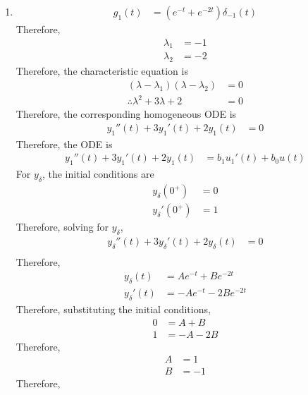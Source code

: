 \documentclass[fleqn, a4paper, 11pt, oneside]{amsart}
\theoremstyle{definition}
\theoremstyle{theorem}
\begin{document}
\begin{solution}
	\begin{enumerate}[leftmargin=*]
		\item
			\begin{align*}
				g_1(t) & = \left( e^{-t} + e^{-2 t} \right) \delta_{-1}(t)
			\end{align*}
			Therefore,
			\begin{align*}
				\lambda_1 & = -1 \\
				\lambda_2 & = -2
			\end{align*}
			Therefore, the characteristic equation is
			\begin{align*}
				(\lambda - \lambda_1) (\lambda - \lambda_2) & = 0 \\
				\therefore \lambda^2 + 3 \lambda + 2        & = 0
			\end{align*}
			Therefore, the corresponding homogeneous ODE is
			\begin{align*}
				{y_1}''(t) + 3 {y_1}'(t) + 2 y_1(t) & = 0
			\end{align*}
			Therefore, the ODE is
			\begin{align*}
				{y_1}''(t) + 3 {y_1}'(t) + 2 y_1(t) & = b_1 {u_1}'(t) + b_0 u(t)
			\end{align*}
			For $y_{\delta}$, the initial conditions are
			\begin{align*}
				y_{\delta}(0^+)    & = 0 \\
				{y_{\delta}}'(0^+) & = 1
			\end{align*}
			Therefore, solving for $y_{\delta}$,
			\begin{align*}
				{y_{\delta}}''(t) + 3 {y_{\delta}}'(t) + 2 y_{\delta}(t) & = 0 \\
			\end{align*}
			Therefore,
			\begin{align*}
				y_{\delta}(t)    & = A e^{-t} + B e^{-2 t} \\
				{y_{\delta}}'(t) & = -A e^{-t} - 2 B e^{-2 t}
			\end{align*}
			Therefore, substituting the initial conditions,
			\begin{align*}
				0 & = A + B \\
				1 & = -A - 2 B
			\end{align*}
			Therefore,
			\begin{align*}
				A & = 1 \\
				B & = -1
			\end{align*}
			Therefore,
			\begin{align*}

\end{align*}
\end{enumerate}
\end{solution}
\end{document}
